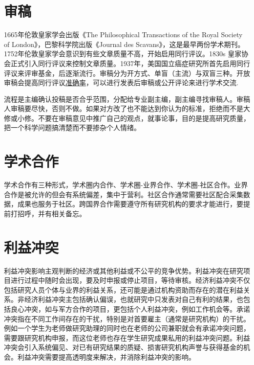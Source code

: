 \documentclass[]{tufte-book}
\begin{document}
\hypertarget{ux5ba1ux7a3f}{%
\section{审稿}\label{ux5ba1ux7a3f}}

1665年伦敦皇家学会出版《The Philosophical Transactions of the Royal Society of London》，巴黎科学院出版《Journal des Scavans》，这是最早两份学术期刊。1752年伦敦皇家学会意识到有些文章质量不高，开始启用同行评议。1830s 皇家协会正式引入同行评议来控制文章质量。1937年，美国国立癌症研究所首先启用同行评议来评审基金，后逐渐流行。审稿分为开方式、单盲（主流）与双盲三种。开放审稿会提高同行评议\href{https://doi.org/10.1371/journal.pone.0026895}{准确率}，可以进行发表后审稿或公开评论来进行学术交流.

流程是主编确认投稿是否合乎范围，分配给专业副主编，副主编寻找审稿人。审稿人审稿要尽快，否则不做。如果对方改了也不能达到你认为的标准，拒绝而不是大修或小修。不要在审稿意见中推广自己的观点，就事论事，目的是提高研究质量，把一个科学问题搞清楚而不要掺杂个人情绪。

\hypertarget{ux5b66ux672fux5408ux4f5c}{%
\section{学术合作}\label{ux5b66ux672fux5408ux4f5c}}

学术合作有三种形式，学术圈内合作、学术圈-业界合作、学术圈-社区合作。业界合作是被允许的但会有系统偏差，集中于营利。社区合作通常需要社区配合采集数据，成果也服务于社区。跨国界合作需要遵守所有研究机构的要求才能进行，要提前打招呼，并有相关备忘。

\hypertarget{ux5229ux76caux51b2ux7a81}{%
\section{利益冲突}\label{ux5229ux76caux51b2ux7a81}}

利益冲突影响主观判断的经济或其他利益或不公平的竞争优势。利益冲突在研究项目进行过程中随时会出现，要及时申报或停止项目，等待审核。经济利益冲突不仅包括研究人员个体与业界的利益关系，还可能是通过机构资助而存在的潜在利益关系。非经济利益冲突主包括确认偏误，也就研究中只发表对自己有利的结果，也包括良心冲突，如与军方合作的项目，更包括个人利益冲突，例如工作机会等。承诺冲突指在不同工作间存在的干扰，特别是对首要雇主（通常是研究机构）的干扰。例如一个学生为老师做研究助理的同时也在老师的公司兼职就会有承诺冲突问题，需要跟研究机构申报，而这位老师也存在学生研究成果私用的利益冲突问题。利益冲突会引入系统偏见、对已有研究结果的质疑、损害研究机构声誉与获得基金的机会。利益冲突需要提高透明度来解决，并消除利益冲突的影响。
\end{document}
